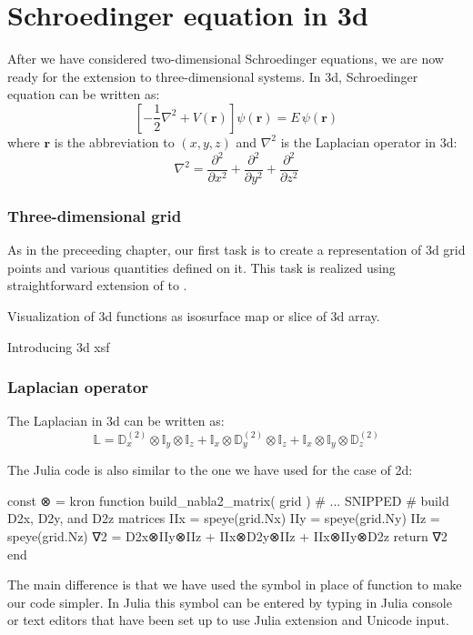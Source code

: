 \chapter{Schroedinger equation in 3d}

After we have considered two-dimensional Schroedinger equations, we are now ready for
the extension to three-dimensional systems. In 3d, Schroedinger equation can be
written as:
\begin{equation}
\left[ -\frac{1}{2}\nabla^2 + V(\mathbf{r}) \right] \psi(\mathbf{r}) = E\,\psi(\mathbf{r})
\end{equation}
where $\mathbf{r}$ is the abbreviation to $(x,y,z)$ and
%
$\nabla^2$ is the Laplacian operator in 3d:
\begin{equation}
\nabla^2 = \frac{\partial^2}{\partial x^2} + \frac{\partial^2}{\partial y^2} +
\frac{\partial^2}{\partial z^2}
\end{equation}

\subsection{Three-dimensional grid}

As in the preceeding chapter, our first task is to create a representation of 3d grid
points and various quantities defined on it. This task is realized using straightforward
extension of  to .


Visualization of 3d functions as isosurface map or slice of 3d array.

Introducing 3d xsf


\subsection{Laplacian operator}

The Laplacian in 3d can be written as:
\begin{equation}
\mathbb{L} = \mathbb{D}^{(2)}_{x} \otimes \mathbb{I}_{y} \otimes \mathbb{I}_{z} +
\mathbb{I}_{x} \otimes \mathbb{D}^{(2)}_{y} \otimes \mathbb{I}_{z} +
\mathbb{I}_{x} \otimes \mathbb{I}_{y} \otimes \mathbb{D}^{(2)}_{z}
\end{equation}

The Julia code is also similar to the one we have used for the case of 2d:
%
\begin{juliacode}
const ⊗ = kron
function build_nabla2_matrix( grid )
  # ... SNIPPED
  # build D2x, D2y, and D2z matrices
  IIx = speye(grid.Nx)
  IIy = speye(grid.Ny)
  IIz = speye(grid.Nz)    
  ∇2 = D2x⊗IIy⊗IIz + IIx⊗D2y⊗IIz + IIx⊗IIy⊗D2z
  return ∇2
end
\end{juliacode}
%
The main difference is that we have used the symbol  in place
of  function to make our code simpler. In Julia this symbol
can be entered by typing \txtinline{\otimes} in Julia console or text editors
that have been set up to use Julia extension and Unicode input.


